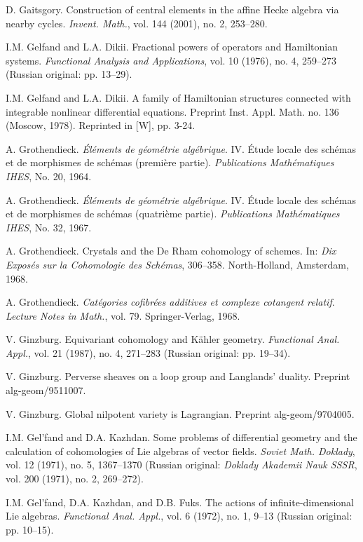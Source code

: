 \begin{description}[leftmargin=3.2em,itemsep=2pt]
\item[{[Ga2001]}] D. Gaitsgory. Construction of central elements in the affine Hecke algebra via nearby cycles. \emph{Invent. Math.}, vol. 144 (2001), no. 2, 253--280.
\item[{[GD76]}] I.M. Gelfand and L.A. Dikii. Fractional powers of operators and Hamiltonian systems. \emph{Functional Analysis and Applications}, vol. 10 (1976), no. 4, 259--273 (Russian original: pp. 13--29).
\item[{[GD78]}] I.M. Gelfand and L.A. Dikii. A family of Hamiltonian structures connected with integrable nonlinear differential equations. Preprint Inst. Appl. Math. no. 136 (Moscow, 1978). Reprinted in [W], pp. 3-24.
\item[{[Gr64]}] A. Grothendieck. \emph{Éléments de géométrie algébrique}. IV. Étude locale des schémas et de morphismes de schémas (première partie). \emph{Publications Mathématiques IHES}, No. 20, 1964.
\item[{[Gr67]}] A. Grothendieck. \emph{Éléments de géométrie algébrique}. IV. Étude locale des schémas et de morphismes de schémas (quatrième partie). \emph{Publications Mathématiques IHES}, No. 32, 1967.
\item[{[Gr68]}] A. Grothendieck. Crystals and the De Rham cohomology of schemes. In: \emph{Dix Exposés sur la Cohomologie des Schémas}, 306--358. North-Holland, Amsterdam, 1968.
\item[{[Gr68a]}] A. Grothendieck. \emph{Catégories cofibrées additives et complexe cotangent relatif}. \emph{Lecture Notes in Math.}, vol. 79. Springer-Verlag, 1968.
\item[{[Gi87]}] V. Ginzburg. Equivariant cohomology and Kähler geometry. \emph{Functional Anal. Appl.}, vol. 21 (1987), no. 4, 271--283 (Russian original: pp. 19--34).
\item[{[Gi95]}] V. Ginzburg. Perverse sheaves on a loop group and Langlands' duality. Preprint alg-geom/9511007.
\item[{[Gi97]}] V. Ginzburg. Global nilpotent variety is Lagrangian. Preprint alg-geom/9704005.
\item[{[GK]}] I.M. Gel'fand and D.A. Kazhdan. Some problems of differential geometry and the calculation of cohomologies of Lie algebras of vector fields. \emph{Soviet Math. Doklady}, vol. 12 (1971), no. 5, 1367--1370 (Russian original: \emph{Doklady Akademii Nauk SSSR}, vol. 200 (1971), no. 2, 269--272).
\item[{[GKF]}] I.M. Gel'fand, D.A. Kazhdan, and D.B. Fuks. The actions of infinite-dimensional Lie algebras. \emph{Functional Anal. Appl.}, vol. 6 (1972), no. 1, 9--13 (Russian original: pp. 10--15).

\end{description}
